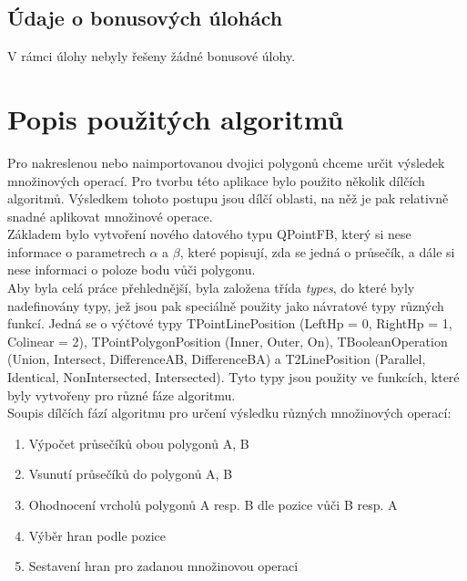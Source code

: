 \documentclass[a4paper,11pt,twoside]{article}
\begin{document}
\subsection{Údaje o bonusových úlohách}
\large
V rámci úlohy nebyly řešeny žádné bonusové úlohy.


\newpage
\vspace*{-1cm}
\renewcommand{\baselinestretch}{1.4} %
\pagestyle{fancy}
\section{Popis použitých algoritmů}
Pro nakreslenou nebo naimportovanou dvojici polygonů chceme určit výsledek množinových operací. Pro tvorbu této aplikace bylo použito několik dílčích algoritmů. Výsledkem tohoto postupu jsou dílčí oblasti, na něž je pak relativně snadné aplikovat množinové operace. \\
\indent Základem bylo vytvoření nového datového typu QPointFB, který si nese informace o parametrech $\alpha$ a $\beta$, které popisují, zda se jedná o průsečík, a dále si nese informaci o poloze bodu vůči polygonu. \\
\indent Aby byla celá práce přehlednější, byla založena třída \textit{types}, do které byly nadefinovány typy, jež jsou pak speciálně použity jako návratové typy různých funkcí. Jedná se o výčtové typy TPointLinePosition (LeftHp = 0, RightHp = 1, Colinear = 2), TPointPolygonPosition (Inner, Outer, On), TBooleanOperation (Union, Intersect, DifferenceAB, DifferenceBA) a T2LinePosition (Parallel, Identical, NonIntersected, Intersected). Tyto typy jsou použity ve funkcích, které byly vytvořeny pro různé fáze algoritmu.\\

\noindent Soupis dílčích fází algoritmu pro určení výsledku různých množinových operací:
\begin{enumerate}
\item Výpočet průsečíků obou polygonů A, B
\item Vsunutí průsečíků do polygonů A, B
\item Ohodnocení vrcholů polygonů A resp. B dle pozice vůči B resp. A
\item Výběr hran podle pozice
\item Sestavení hran pro zadanou množinovou operaci
\end{enumerate}
\end{document}
